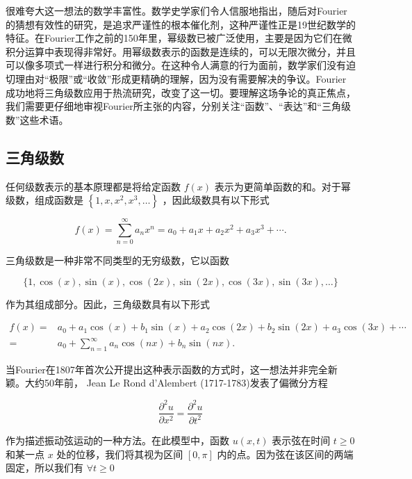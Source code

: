 很难夸大这一想法的数学丰富性。数学史学家们令人信服地指出，随后对Fourier的猜想有效性的研究，是追求严谨性的根本催化剂，这种严谨性正是19世纪数学的特征。在Fourier工作之前的150年里，幂级数已被广泛使用，主要是因为它们在微积分运算中表现得非常好。用幂级数表示的函数是连续的，可以无限次微分，并且可以像多项式一样进行积分和微分。在这种令人满意的行为面前，数学家们没有迫切理由对“极限”或“收敛”形成更精确的理解，因为没有需要解决的争议。Fourier成功地将三角级数应用于热流研究，改变了这一切。要理解这场争论的真正焦点，我们需要更仔细地审视Fourier所主张的内容，分别关注“函数”、“表达”和“三角级数”这些术语。

\subsection{三角级数}

任何级数表示的基本原理都是将给定函数 \(f\left( x\right)\) 表示为更简单函数的和。对于幂级数，组成函数是 \(\left\{  {1,x,{x}^{2},{x}^{3},\ldots }\right\}\) ，因此级数具有以下形式

\[
f\left( x\right)  = \mathop{\sum }\limits_{{n = 0}}^{\infty }{a}_{n}{x}^{n} = {a}_{0} + {a}_{1}x + {a}_{2}{x}^{2} + {a}_{3}{x}^{3} + \cdots .
\]

三角级数是一种非常不同类型的无穷级数，它以函数

\[
\{ 1,\cos \left( x\right) ,\sin \left( x\right) ,\cos \left( {2x}\right) ,\sin \left( {2x}\right) ,\cos \left( {3x}\right) ,\sin \left( {3x}\right) ,\ldots \}
\]

作为其组成部分。因此，三角级数具有以下形式

\begin{align*}
f\left( x\right)  =  &{a}_{0} + {a}_{1}\cos \left( x\right)  + {b}_{1}\sin \left( x\right)  + {a}_{2}\cos \left( {2x}\right)  + {b}_{2}\sin \left( {2x}\right)  + {a}_{3}\cos \left( {3x}\right)  + \cdots\\
=& {a}_{0} + \mathop{\sum }\limits_{{n = 1}}^{\infty }{a}_{n}\cos \left( {nx}\right)  + {b}_{n}\sin \left( {nx}\right) .
\end{align*}

当Fourier在1807年首次公开提出这种表示函数的方式时，这一想法并非完全新颖。大约50年前， Jean Le Rond d'Alembert (1717-1783)发表了偏微分方程

\begin{equation}
\label{eq:8.3.1}
\frac{{\partial }^{2}u}{\partial {x}^{2}} = \frac{{\partial }^{2}u}{\partial {t}^{2}}
\end{equation}

作为描述振动弦运动的一种方法。在此模型中，函数 \(u\left( {x,t}\right)\) 表示弦在时间 \(t \geq  0\) 和某一点 \(x\) 处的位移，我们将其视为区间 \(\left\lbrack  {0,\pi }\right\rbrack\) 内的点。因为弦在该区间的两端固定，所以我们有 $\forall t \ge 0$

